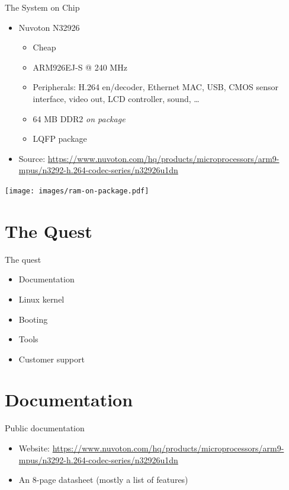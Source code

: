\documentclass[xetex,table]{beamer}
\begin{document}
\begin{frame}{The System on Chip}
  \begin{itemize}
  \item Nuvoton N32926
    \begin{itemize}
    \item Cheap
    \item ARM926EJ-S @ 240 MHz
    \item Peripherals: H.264 en/decoder, Ethernet MAC, USB, CMOS
      sensor interface, video out, LCD controller, sound, \dots
    \item 64 MB DDR2 {\em on package}
    \item LQFP package
    \end{itemize}
  \item{\tiny Source:
    \url{https://www.nuvoton.com/hq/products/microprocessors/arm9-mpus/n3292-h.264-codec-series/n32926u1dn}}
  \end{itemize}
  \begin{flushright}
    \texttt{[image: images/ram-on-package.pdf]}
  \end{flushright}
\end{frame}

\section{The Quest}

\begin{frame}{The quest}
  \begin{itemize}
  \item Documentation
  \item Linux kernel
  \item Booting
  \item Tools
  \item Customer support
  \end{itemize}
\end{frame}

\section{Documentation}

\begin{frame}{Public documentation}
  \begin{itemize}
  \item Website:{\tiny
    \url{https://www.nuvoton.com/hq/products/microprocessors/arm9-mpus/n3292-h.264-codec-series/n32926u1dn}}
  \item An 8-page datasheet (mostly a list of features)
  \end{itemize}
\end{frame}
\end{document}
